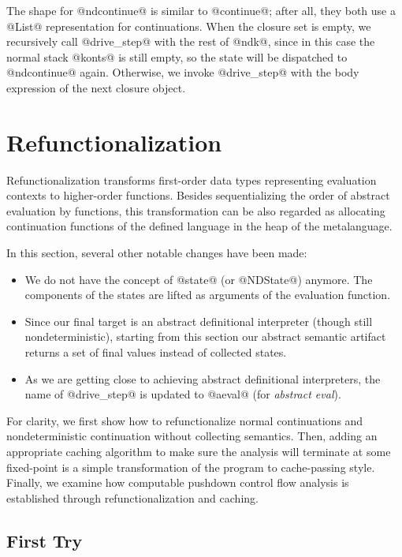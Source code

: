 \documentclass[acmsmall,review,anonymous]{acmart}\settopmatter{printfolios=true,printccs=false,printacmref=false}
\begin{document}
The shape for @ndcontinue@ is similar to @continue@; after
all, they both use a @List@ representation for continuations.
When the closure set is empty, we recursively call @drive_step@ with the rest
of @ndk@, since in this case the normal stack @konts@ is still empty, so
the state will be dispatched to @ndcontinue@ again.
Otherwise, we invoke @drive_step@ with the body expression of the next closure object.

\section{Refunctionalization} \label{refunc}

Refunctionalization transforms first-order data types representing
evaluation contexts to higher-order functions.
Besides sequentializing the order of abstract evaluation by functions,
this transformation can be also regarded as allocating continuation functions of
the defined language in the heap of the metalanguage.

In this section, several other notable changes have been made:
\begin{itemize}
\item We do not have the concept of @state@ (or @NDState@) anymore.
The components of the states are lifted as arguments of the evaluation
function.
\item Since our final target is an abstract definitional interpreter (though still
nondeterministic), starting from this section our abstract semantic artifact
returns a set of final values instead of collected states.
\item As we are getting close to achieving
abstract definitional interpreters, the name of @drive_step@ is updated to
@aeval@ (for \emph{abstract eval}).
\end{itemize}

For clarity, we first show how to refunctionalize normal continuations and
nondeterministic continuation without collecting semantics.
Then, adding an appropriate caching algorithm to make sure the analysis will
terminate at some fixed-point is a simple transformation of the program to cache-passing
style. Finally, we examine how computable pushdown control flow analysis is established
through refunctionalization and caching.

\subsection{First Try}
\end{document}
